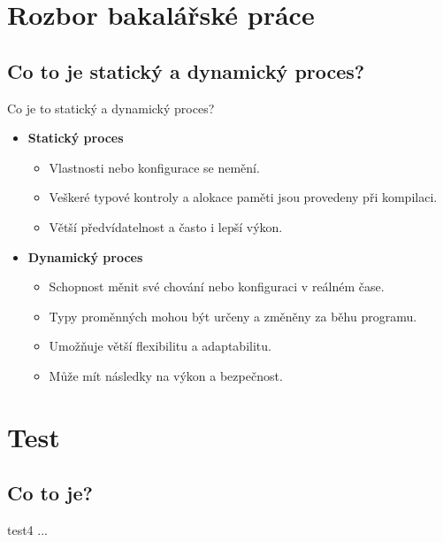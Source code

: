\documentclass{beamer}
\begin{document}
\section{Rozbor bakalářské práce}
\subsection{Co to je statický a dynamický proces?}
\begin{frame}{Co je to statický a dynamický proces?}
	\begin{itemize}
		\item \textbf{Statický proces}
			\begin{itemize}
				\item[\textendash] Vlastnosti nebo konfigurace se nemění.
				\item[\textendash] Veškeré typové kontroly a alokace paměti jsou provedeny při kompilaci.
				\item[\textendash] Větší předvídatelnost a často i lepší výkon.
			\end{itemize}
		\item \textbf{Dynamický proces}
			\begin{itemize}
				\item[\textendash] Schopnost měnit své chování nebo konfiguraci v reálném čase.
				\item[\textendash] Typy proměnných mohou být určeny a změněny za běhu programu.
				\item[\textendash] Umožňuje větší flexibilitu a adaptabilitu.
				\item[\textendash] Může mít následky na výkon a bezpečnost.
			\end{itemize}
	\end{itemize}

\end{frame}

\section{Test}
\subsection{Co to je?}
\begin{frame}{test4}
...
\end{frame}
\end{document}
